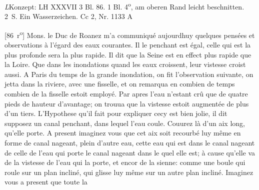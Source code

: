 \begin{Ueberlieferung}%
{\textit{L}}Konzept: LH XXXVII 3 Bl. 86.
1 Bl. 4\textsuperscript{o}, am oberen Rand leicht beschnitten. 2~S.
Ein Wasserzeichen.
\newline%
Cc 2, Nr. 1133 A
\end{Ueberlieferung}
%
%
\count{}
\count{}
\count{}
\pstartfirst
[86~r\textsuperscript{o}]%
Mons. le Duc de Roanez\protect{} m'a communiqu\'{e} aujourdhuy quelques pensées et observations à l'égard
des eaux courantes. Il  le penchant est égal, celle qui est la plus profonde sera la plus rapide. Il dit que la Seine est en effect plus rapide que la Loire. Que dans les inondations\protect{} quand les eaux 
croissent, leur vistesse croist aussi. A Paris\protect{} du temps de la grande inondation\protect{}, on fit l'observation suivante, 
on jetta  dans la riviere, avec une fisselle, et on remarqua en combien de temps combien de la fisselle estoit employé. Par apres l'eau n'estant cr\^{u} que de quatre pieds de hauteur d'avantage; on trouua que la vistesse\protect{} estoit augmentée de plus d'un tiers. L'Hypothese qu'il fait pour expliquer cecy est bien jolie, il dit supposez un canal penchant, dans lequel l'eau coule. Couurez là d'un aix\protect{} long, qu'elle porte. A present imaginez vous que cet aix\protect{} soit recourbé luy m\^{e}me en forme de canal nageant, plein d'autre eau, cette eau qui est dans le canal nageant  de celle de l'eau qui porte le canal nageant dans le quel elle est; à cause qu'elle va de la vistesse de l'eau\protect{} qui la porte, et encor de la sienne: comme une boule qui roule sur un plan incliné, qui glisse luy m\^{e}me sur un autre plan incliné. Imaginez vous a present que toute la  
